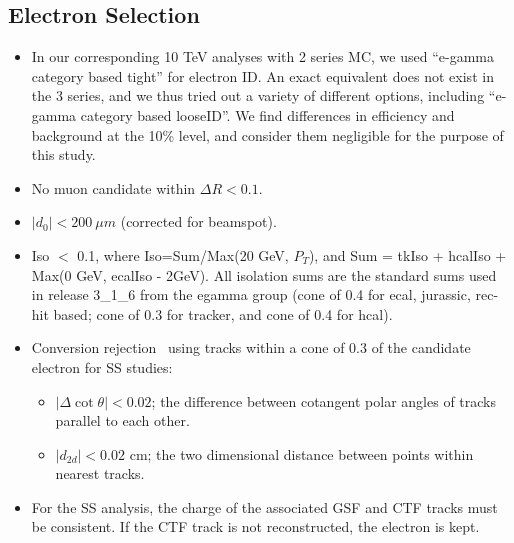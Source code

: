 \subsection{Electron Selection}
\label{sec:electron}

\begin{itemize}
\item In our corresponding 10 TeV analyses with 2 series MC, we used ``e-gamma category based tight'' for electron ID.
      An exact equivalent does not exist in the 3 series, and we thus tried out a variety of different options, including ``e-gamma category based looseID''.
      We find differences in efficiency and background at the 10\% level, and consider them negligible for the purpose of this study.
\item No muon candidate within $\Delta R < 0.1$.
\item $|d_0| < 200~\mu m$ (corrected for beamspot).
\item Iso $<$ 0.1, where Iso=Sum/Max(20 GeV, $P_T$), and Sum = tkIso + hcalIso +  Max(0 GeV, ecalIso - 2GeV).
All isolation sums are the standard sums used in release 3\_1\_6 from the egamma group (cone of
0.4 for ecal, jurassic, rec-hit based; cone of 0.3 for tracker, and cone of 0.4 for hcal).
\item Conversion rejection~\cite{conversionnote} using tracks within a cone of 0.3 of the candidate electron for SS studies: 
\begin{itemize}
\item $|\Delta \cot\theta| < 0.02$; the difference between cotangent polar angles of tracks parallel to 
each other.
\item $|d_{2d}| < 0.02$ cm; the two dimensional distance between points within nearest tracks.
\end{itemize} 
\item For the SS analysis, the charge of the associated GSF and CTF tracks must be consistent.
If the CTF track is not reconstructed, the electron is kept.
\end{itemize}

